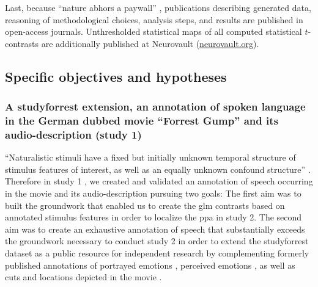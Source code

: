 Last, because ``nature abhors a paywall'' \citep{dupre2020nature}, publications
describing generated data, reasoning of methodological choices, analysis steps,
and results are published in open-access journals.
Unthresholded statistical maps of all computed statistical $t$-contrasts are
additionally published at Neurovault
(\href{https://neurovault.org/}{neurovault.org}).


\subsection{Specific objectives and hypotheses}



\subsubsection{A studyforrest extension, an annotation of spoken
language in the German dubbed movie ``Forrest Gump'' and its audio-description
(study 1)}

``Naturalistic stimuli have a fixed but initially unknown temporal structure of
stimulus features of interest, as well as an equally unknown confound
structure'' \citep{haeusler2021speechanno}.
Therefore in study 1 \citep{haeusler2021speechanno}, we created and validated an
annotation of speech occurring in the movie and its audio-description pursuing
two goals:
The first aim was to built the groundwork that enabled us to create the \ac{glm}
contrasts based on annotated stimulus features in order to localize the \ac{ppa}
in study 2.
The second aim was to create an exhaustive annotation of speech that
substantially exceeds the groundwork necessary to conduct study 2 in order to
extend the studyforrest dataset as a public resource for independent research by
complementing formerly published annotations of portrayed emotions
\citep{labs2015portrayed}, perceived emotions \citep{lettieri2019emotionotopy},
as well as cuts and locations depicted in the movie \citep{haeusler2016cutanno}.

